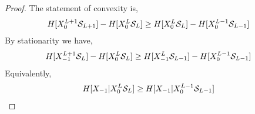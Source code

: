 \begin{proof}
The statement of convexity is,
\begin{align*}
H[{X}_{0}^{L+1} \mathcal{S}_{L+1}] - H[{X}_{0}^{L} \mathcal{S}_{L}] &\ge H[{X}_{0}^{L} \mathcal{S}_{L}] - H[{X}_{0}^{L-1} \mathcal{S}_{L-1}]
\end{align*}
By stationarity we have,
\begin{align*}
H[{X}_{-1}^{L+1} \mathcal{S}_{L}] - H[{X}_{0}^{L} \mathcal{S}_{L}] &\ge H[{X}_{-1}^{L} \mathcal{S}_{L-1}] - H[{X}_{0}^{L-1} \mathcal{S}_{L-1}]
\end{align*}
Equivalently,
\begin{align*}
H[{X}_{-1} | {X}_{0}^{L} \mathcal{S}_{L}] &\ge H[{X}_{-1} | {X}_{0}^{L-1} \mathcal{S}_{L-1}]
\end{align*}


\end{proof}
